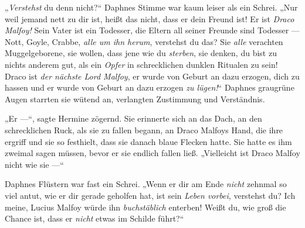 „\emph{Verstehst} du denn nicht?“ Daphnes Stimme war kaum leiser als ein Schrei.
„Nur weil jemand nett zu dir ist, heißt das nicht, dass er dein Freund ist! Er ist \emph{Draco Malfoy!} Sein Vater ist ein Todesser, die Eltern all seiner Freunde sind Todesser — Nott, Goyle, Crabbe, \emph{alle um ihn herum}, verstehst du das? Sie \emph{alle} verachten Muggelgeborene, sie wollen, dass jene wie du \emph{sterben}, sie denken, du bist zu nichts anderem gut, als ein \emph{Opfer} in schrecklichen dunklen Ritualen zu sein! Draco ist \emph{der nächste Lord Malfoy}, er wurde von Geburt an dazu erzogen, dich zu hassen und er wurde von Geburt an dazu erzogen \emph{zu lügen!}“ Daphnes graugrüne Augen starrten sie wütend an, verlangten Zustimmung und Verständnis.

„Er —“, sagte Hermine zögernd. Sie erinnerte sich an das Dach, an den schrecklichen Ruck, als sie zu fallen begann, an Draco Malfoys Hand, die ihre ergriff und sie so festhielt, dass sie danach blaue Flecken hatte. Sie hatte es ihm zweimal sagen müssen, bevor er sie endlich fallen ließ.
„Vielleicht ist Draco Malfoy nicht wie sie —“

Daphnes Flüstern war fast ein Schrei.
„Wenn er dir am Ende \emph{nicht} zehnmal so viel antut, wie er dir gerade geholfen hat, ist sein \emph{Leben vorbei}, verstehst du? Ich meine, Lucius Malfoy würde ihn \emph{buchstäblich} enterben! Weißt du, wie groß die Chance ist, dass er \emph{nicht} etwas im Schilde führt?“

